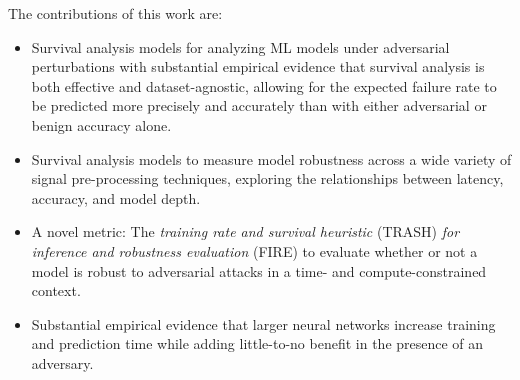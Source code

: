 The contributions of this work are:
\begin{itemize}
	\item Survival analysis models for analyzing ML models under adversarial perturbations with substantial empirical evidence that survival analysis is both effective and dataset-agnostic, allowing for the expected failure rate to be predicted more precisely and accurately than with either adversarial or benign accuracy alone.
	\item Survival analysis models to measure model robustness across a wide variety of signal pre-processing techniques, exploring the relationships between latency, accuracy, and model depth.
	\item A novel metric: The \textit{training rate and survival heuristic } (TRASH) \textit{for inference and robustness evaluation} (FIRE) to evaluate whether or not a model is robust to adversarial attacks in a time- and compute-constrained context.
	\item Substantial empirical evidence that larger neural networks increase training and prediction time while adding little-to-no benefit in the presence of an adversary.
\end{itemize}
